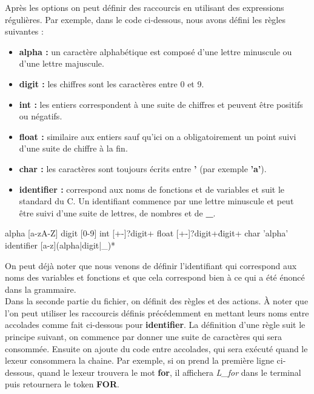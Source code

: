 \documentclass[a4paper]{article}%
\begin{document}
Après les options on peut définir des raccourcis en utilisant des expressions
régulières. Par exemple, dans le code ci-dessous, nous avons défini les règles
suivantes :

\begin{itemize}
  \item \textbf{alpha :} un caractère alphabétique est composé d'une lettre
    minuscule ou d'une lettre majuscule.
  \item \textbf{digit :} les chiffres sont les caractères entre 0 et 9.
  \item \textbf{int :} les entiers correspondent à une suite de chiffres et
    peuvent être positifs ou négatifs.
  \item \textbf{float :} similaire aux entiers sauf qu'ici on a obligatoirement
    un point suivi d'une suite de chiffre à la fin.
  \item \textbf{char :} les caractères sont toujours écrits entre \textbf{'}
    (par exemple \textbf{'a'}).
  \item \textbf{identifier :} correspond aux noms de fonctions et de variables
    et suit le standard du C. Un identifiant commence par une lettre minuscule
    et peut être suivi d'une suite de lettres, de nombres et de \textbf{\_}.
\end{itemize}

\begin{code}
alpha [a-zA-Z]
digit [0-9]
int [+-]?{digit}+
float [+-]?{digit}+\.{digit}+
char '{alpha}'
identifier [a-z]({alpha}|{digit}|_)*
\end{code}\leavevmode\newline

\noindent

On peut déjà noter que nous venons de définir l'identifiant qui correspond aux
noms des variables et fonctions et que cela correspond bien à ce qui a été
énoncé dans la grammaire.\\

Dans la seconde partie du fichier, on définit des règles et des actions. À noter
que l'on peut utiliser les raccourcis définis précédemment en mettant leurs noms
entre accolades comme fait ci-dessous pour \textbf{identifier}. La définition
d'une règle suit le principe suivant, on commence par donner une suite de
caractères qui sera consommée. Ensuite on ajoute du code entre accolades, qui
sera exécuté quand le lexeur consommera la chaine. Par exemple, si on prend la
première ligne ci-dessous, quand le lexeur trouvera le mot \textbf{for}, il
affichera \textit{L\_for} dans le terminal puis retournera le token \textbf{FOR}.
\end{document}
